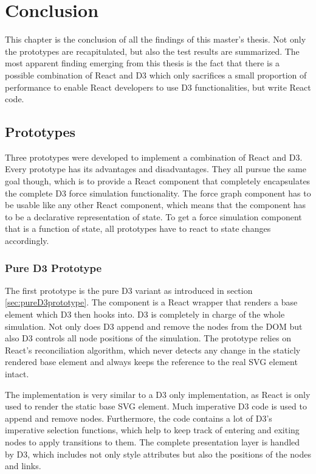 \chapter{Conclusion}
\label{cha:conclusion}

This chapter is the conclusion of all the findings of this master's thesis. Not only the prototypes are recapitulated, but also the test results are summarized. The most apparent finding emerging from this thesis is the fact that there is a possible combination of React and D3 which only sacrifices a small proportion of performance to enable React developers to use D3 functionalities, but write React code.

\section{Prototypes}

Three prototypes were developed to implement a combination of React and D3. Every prototype has its advantages and disadvantages. They all pursue the same goal though, which is to provide a React component that completely encapsulates the complete D3 force simulation functionality. The force graph component has to be usable like any other React component, which means that the component has to be a declarative representation of state. To get a force simulation component that is a function of state, all prototypes have to react to state changes accordingly.

\subsection{Pure D3 Prototype}

The first prototype is the pure D3 variant as introduced in section \ref{sec:pureD3prototype}. The component is a React wrapper that renders a base element which D3 then hooks into. D3 is completely in charge of the whole simulation. Not only does D3 append and remove the nodes from the DOM but also D3 controls all node positions of the simulation. The prototype relies on React's reconciliation algorithm, which never detects any change in the staticly rendered base element and always keeps the reference to the real SVG element intact.

The implementation is very similar to a D3 only implementation, as React is only used to render the static base SVG element. Much imperative D3 code is used to append and remove nodes. Furthermore, the code contains a lot of D3's imperative selection functions, which help to keep track of entering and exiting nodes to apply transitions to them. The complete presentation layer is handled by D3, which includes not only style attributes but also the positions of the nodes and links.

